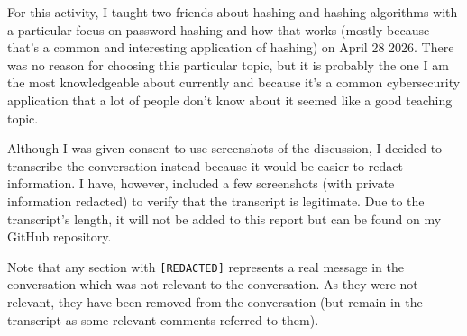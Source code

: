 For this activity, I taught two friends about hashing and hashing
algorithms with a particular focus on password hashing and how that
works (mostly because that's a common and interesting application of
hashing) on April 28 2026. There was no reason for choosing this
particular topic, but it is probably the one I am the most knowledgeable
about currently and because it's a common cybersecurity application that
a lot of people don't know about it seemed like a good teaching topic.

Although I was given consent to use screenshots of the discussion, I
decided to transcribe the conversation instead because it would be
easier to redact information. I have, however, included a few
screenshots (with private information redacted) to verify that the
transcript is legitimate. Due to the transcript's length, it will not be
added to this report but can be found on my GitHub repository.

Note that any section with \texttt{{[}REDACTED{]}} represents a real
message in the conversation which was not relevant to the conversation.
As they were not relevant, they have been removed from the conversation
(but remain in the transcript as some relevant comments referred to
them).
